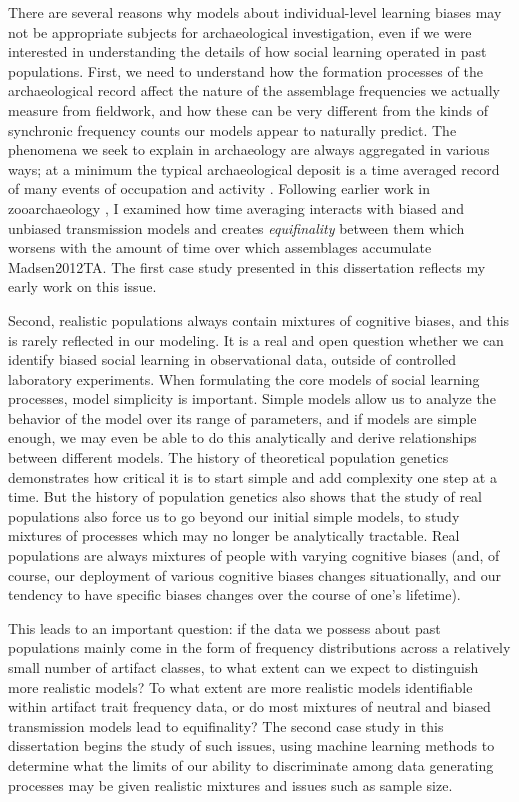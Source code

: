 There are several reasons why models about individual-level learning biases may not be appropriate subjects for archaeological investigation, even if we were interested in understanding the details of how social learning operated in past populations.  First, we need to understand how the formation processes of the archaeological record affect the nature of the assemblage frequencies we actually measure from fieldwork, and how these can be very different from the kinds of synchronic frequency counts our models appear to naturally predict.  The phenomena we seek to explain in archaeology are always aggregated in various ways; at a minimum the typical archaeological deposit is a time averaged record of many events of occupation and activity \citep{bailey2007time,bailey1981concepts,binford1981behavioral,8981,stein1987deposits}.  Following earlier work in zooarchaeology \citep{Lyman2003}, I examined how time averaging interacts with biased and unbiased transmission models and creates \textit{equifinality} between them which worsens with the amount of time over which assemblages accumulate \citep{}{Madsen2012TA}.  The first case study presented in this dissertation reflects my early work on this issue. 

Second, realistic populations always contain mixtures of cognitive biases, and this is rarely reflected in our modeling.  It is a real and open question whether we can identify biased social learning in observational data, outside of controlled laboratory experiments.  When formulating the core models of social learning processes, model simplicity is important.  Simple models allow us to analyze the behavior of the model over its range of parameters, and if models are simple enough, we may even be able to do this analytically and derive relationships between different models.  The history of theoretical population genetics demonstrates how critical it is to start simple and add complexity one step at a time.  But the history of population genetics also shows that the study of real populations also force us to go beyond our initial simple models, to study mixtures of processes which may no longer be analytically tractable.  Real populations are always mixtures of people with varying cognitive biases (and, of course, our deployment of various cognitive biases changes situationally, and our tendency to have specific biases changes over the course of one's lifetime). 

This leads to an important question:  if the data we possess about past populations mainly come in the form of frequency distributions across a relatively small number of artifact classes, to what extent can we expect to distinguish more realistic models?  To what extent are more realistic models identifiable within artifact trait frequency data, or do most mixtures of neutral and biased transmission models lead to equifinality?  The second case study in this dissertation begins the study of such issues, using machine learning methods to determine what the limits of our ability to discriminate among data generating processes may be given realistic mixtures and issues such as sample size.  

